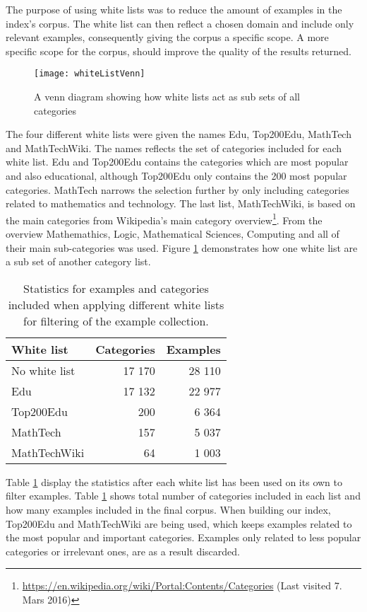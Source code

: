 The purpose of using white lists was to reduce the amount of examples in the index's corpus. The white list can then reflect a chosen domain and include only relevant examples, consequently giving the corpus a specific scope. A more specific scope for the corpus, should improve the quality of the results returned. 

\begin{figure}[h] 
\caption{A venn diagram showing how white lists act as sub sets of all categories}
\texttt{[image: whiteListVenn]}
\label{fig:whiteListVenn}
\end{figure}
The four different white lists were given the names Edu, Top200Edu, MathTech and MathTechWiki. The names reflects the set of categories included for each white list. Edu and Top200Edu contains the categories which are most popular and also educational, although Top200Edu only contains the 200 most popular categories. MathTech narrows the selection further by only including categories related to mathematics and technology. The last list, MathTechWiki, is based on the main categories from Wikipedia's main category overview\footnote{\url{https://en.wikipedia.org/wiki/Portal:Contents/Categories} (Last visited 7. Mars 2016)}. From the overview Mathemathics, Logic, Mathematical Sciences, Computing and all of their main sub-categories was used. Figure \ref{fig:whiteListVenn} demonstrates how one white list are a sub set of another category list. 

\begin{table}[h!]
\centering
\begin{tabular} {|| p{10em} | r | r||} 
 \hline
  White list & Categories & Examples \\ [0.5ex] 
 \hline
No white list & 17 170 & 28 110 \\
Edu & 17 132 & 22 977 \\
Top200Edu & 200 & 6 364 \\
MathTech & 157 & 5 037 \\
MathTechWiki & 64 & 1 003 \\

 \hline
\end{tabular}
\caption{Statistics for examples and categories included when applying different white lists for filtering of the example collection.}
\label{table:whitelist_stats}
\end{table}

Table \ref{table:whitelist_stats} display the statistics after each white list has been used on its own to filter examples. Table \ref{table:whitelist_stats} shows total number of categories included in each list and how many examples included in the final corpus.
When building our index, Top200Edu and MathTechWiki are being used, which keeps examples related to the most popular and important categories. Examples only related to less popular categories or irrelevant ones, are as a result discarded.


